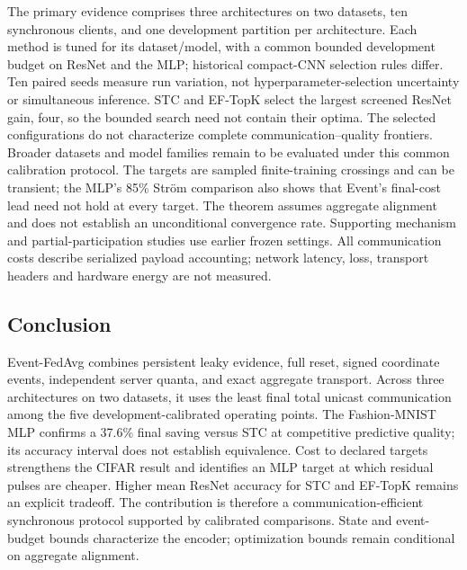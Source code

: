 \documentclass[conference]{IEEEtran}
\newcommand{\mlpColor}{\color{mlporange}}
\newcommand{\mlpRev}[1]{{\mlpColor #1}}
\begin{document}
\mlpRev{The primary evidence comprises three architectures on two datasets, ten
synchronous clients, and one development partition per architecture. Each
method is tuned for its dataset/model, with a common bounded development budget
on ResNet and the MLP; historical compact-CNN selection rules differ. Ten paired seeds
measure run variation, not hyperparameter-selection uncertainty or simultaneous
inference. STC and EF-TopK select the largest screened ResNet gain, four, so the
bounded search need not contain their optima. The selected configurations do
not characterize complete communication--quality frontiers. Broader datasets and model families remain
to be evaluated under this common calibration protocol. The targets are sampled finite-training
crossings and can be transient; the MLP's 85\% Str\"om comparison also shows
that Event's final-cost lead need not hold at every target.
The theorem assumes aggregate alignment and
does not establish an unconditional convergence rate. Supporting mechanism and
partial-participation studies use earlier frozen settings. All communication
costs describe serialized payload accounting; network latency, loss, transport
headers and hardware energy are not measured.}

\begin{samepage}
\section{Conclusion}
\label{sec:conclusion}

\mlpRev{Event-FedAvg combines persistent leaky evidence, full reset, signed
coordinate events, independent server quanta, and exact aggregate transport.
Across three architectures on two datasets, it uses the least final total
unicast communication among the five development-calibrated operating points.
The Fashion-MNIST MLP confirms a 37.6\% final saving versus STC at competitive
predictive quality; its accuracy interval does not establish equivalence.
Cost to declared targets strengthens the CIFAR result and identifies an MLP
target at which residual pulses are cheaper. Higher mean ResNet accuracy for
STC and EF-TopK remains an explicit tradeoff. The contribution is therefore a
communication-efficient synchronous protocol supported by calibrated comparisons.
State and event-budget bounds characterize the encoder; optimization bounds
remain conditional on aggregate alignment.}

\end{samepage}
\end{document}
